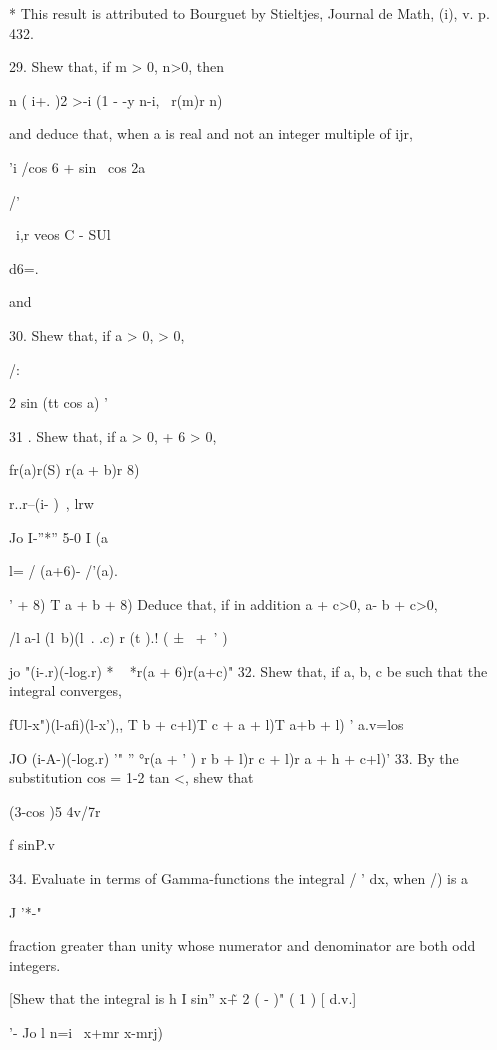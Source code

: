 * This result is attributed to Bourguet by Stieltjes, Journal de Math,
(i), v. p. 432.

%
%

29. Shew that, if m > 0, n>0, then

n ( i+. )2 >-i (1 - -y n-i, \ r(m)r n)

and deduce that, when a is real and not an integer multiple of ijr,

'i /cos 6 + sin \ cos 2a

/'

\ i,r veos C - SUl

d6=.

and

30. Shew that, if a > 0, > 0,

/:

2 sin (tt cos a) '



31 . Shew that, if a > 0, + 6 > 0,

fr(a)r(S) r(a + b)r 8)

r..r--(i- ) \,, lrw

Jo I-''*'' 5-0 I (a

l= / (a+6)- /'(a).

' + 8) T a + b + 8) Deduce that, if in addition a + c>0, a- b + c>0,

/l a-l (l\ b)(l\ . .c) r (t ).! ( ± \ +\ ' )

jo "(i-.r)(-log.r) * ~ *r(a + 6)r(a+c)" 32. Shew that, if a, b, c be
such that the integral converges,

fUl-x")(l-afi)(l-x'),, T b + c+l)T c + a + l)T a+b + l) ' a.v=los

JO (i-A-)(-log.r) '" '' °r(a + ' ) r b + l)r c + l)r a + h + c+l)' 33.
By the substitution cos = 1-2 tan <, shew that

(3-cos )5 4v/7r


f sinP.v

34. Evaluate in terms of Gamma-functions the integral / ' dx, when /)
is a

J '*-"

fraction greater than unity whose numerator and denominator are both
odd integers.

[Shew that the integral is h I sin'' x\~+ 2 ( - )" ( 1 ) [ d.v.]

'- Jo l n=i \ x+mr x-mrj)

